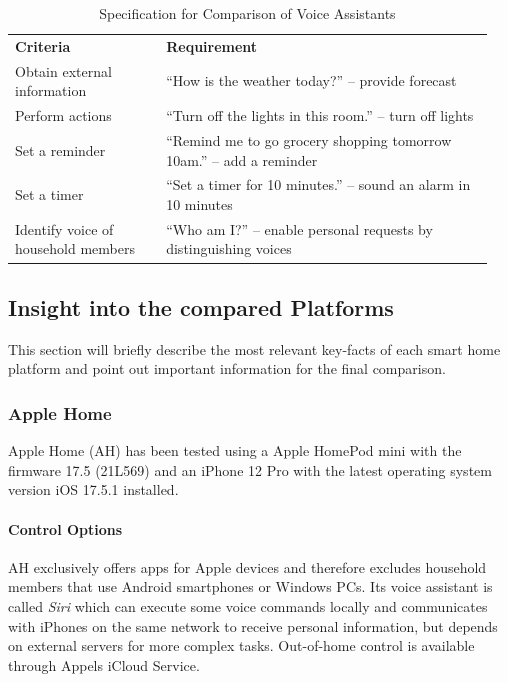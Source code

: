 \begin{table}[H]
    \centering
    \caption{Specification for Comparison of Voice Assistants}
    \label{tab:spec_voiceassistant}
    \begin{tabular}{ >{\raggedright} p{0.3\linewidth} p{0.65\linewidth} }
        \toprule
        \multicolumn{2}{ l }{\textbf{Voice Assistants}} \\
        \midrule
        \textbf{Criteria} & \textbf{Requirement} \\
        \midrule
        Obtain external information & “How is the weather today?” – provide forecast \\ \addlinespace
        Perform actions & “Turn off the lights in this room.” – turn off lights \\ \addlinespace
        Set a reminder & “Remind me to go grocery shopping tomorrow 10am.” – add a reminder \\ \addlinespace
        Set a timer & “Set a timer for 10 minutes.” – sound an alarm in 10 minutes \\ \addlinespace
        Identify voice of household members & “Who am I?” – enable personal requests by distinguishing voices \\
        \bottomrule
    \end{tabular}
\end{table}

\newpage

\subsection{Insight into the compared Platforms} \label{sec:obs_evaluation}

This section will briefly describe the most relevant key-facts of each smart home platform and point out important information for the final comparison.

\subsubsection{Apple Home}
Apple Home (AH) has been tested using a Apple HomePod mini with the firmware 17.5 (21L569) and an iPhone 12 Pro with the latest operating system version iOS 17.5.1 installed.

\paragraph{Control Options}
AH exclusively offers apps for Apple devices and therefore excludes household members that use Android smartphones or Windows PCs. Its voice assistant is called \textit{Siri} which can execute some voice commands locally and communicates with iPhones on the same network to receive personal information, but depends on external servers for more complex tasks. Out-of-home control is available through Appels iCloud Service.


